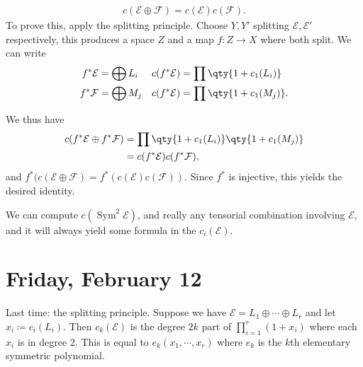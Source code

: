 \begin{example}[?]

\begin{align*}
c( \mathcal{E} \oplus \mathcal{F}) = c( \mathcal{E} ) c( \mathcal{F} )
.\end{align*}
To prove this, apply the splitting principle. Choose \(Y, Y'\) splitting
\(\mathcal{E}, \mathcal{E}'\) respectively, this produces a space \(Z\)
and a map \(f:Z\to X\) where both split. We can write
\begin{align*}
f^* \mathcal{E} &= \bigoplus L_i 
&& c(f^* \mathcal{E} ) = \prod \qty{ 1 + c_1(L_i) } \\
f^* \mathcal{F} &= \bigoplus M_j 
&& c(f^* \mathcal{E} ) = \prod \qty{ 1 + c_1(M_j) }
.\end{align*}

We thus have
\begin{align*}
c( f^* \mathcal{E} \oplus f^* \mathcal{F} ) 
&= \prod \qty{1 + c_1(L_i) } \qty{1 + c_1(M_j)} \\
&= c(f^* \mathcal{E} ) c(f^* \mathcal{F} )
,\end{align*}
and
\(f^* (c( \mathcal{E} \oplus \mathcal{F} ) = f^* (c (\mathcal{E}) c( \mathcal{F}))\).
Since \(f^*\) is injective, this yields the desired identity.

\end{example}

\begin{example}[?]

We can compute \(c(\operatorname{Sym}^2 \mathcal{E})\), and really any
tensorial combination involving \(\mathcal{E}\), and it will always
yield some formula in the \(c_i( \mathcal{E} )\).

\end{example}

\hypertarget{friday-february-12}{%
\section{Friday, February 12}\label{friday-february-12}}

\begin{remark}

Last time: the splitting principle. Suppose we have
\(\mathcal{E} = L_1 \oplus \cdots \oplus L_r\) and let
\(x_i \coloneqq c_i(L_i)\). Then \(c_k(\mathcal{E})\) is the degree
\(2k\) part of \(\prod_{i=1}^r (1 + x_i )\) where each \(x_i\) is in
degree \(2\). This is equal to \(e_k(x_1, \cdots, x_r)\) where \(e_k\)
is the \(k\)th elementary symmetric polynomial.

\end{remark}

